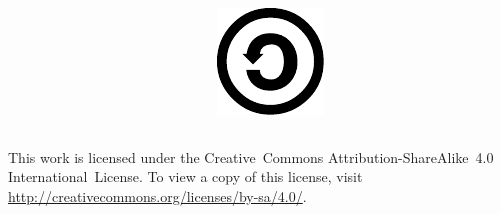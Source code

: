 \documentclass{beamer}
\begin{document}
\begin{frame}
\begin{columns}[T]
\begin{column}[T]{.2\textwidth}
            \end{column}
            \begin{column}[T]{.2\textwidth}
                \centering
                \includegraphics[width=\textwidth]{sa.pdf}
            \end{column}
        \end{columns}
        \vfill
        This work is licensed under the
        Creative~Commons Attribution-ShareAlike~4.0 International~License.
        To view a copy of this license, visit
        \url{http://creativecommons.org/licenses/by-sa/4.0/}.
    \end{frame}
\end{document}
